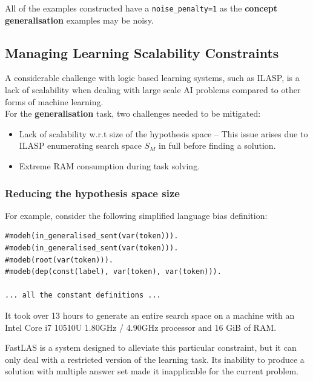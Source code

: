 All of the examples constructed have a \verb+noise_penalty=1+ as the \textbf{concept generalisation} examples may be noisy.


\subsection{Managing Learning Scalability Constraints}

A considerable challenge with logic based learning systems, such as ILASP, is a lack of scalability when dealing with large scale AI problems compared to other forms of machine learning. \\
For the \textbf{generalisation} task, two challenges needed to be mitigated: 
\begin{itemize}
    \item Lack of scalability w.r.t size of the hypothesis space -- This issue arises due to ILASP enumerating search space $S_M$ in full before finding a solution.
    \item Extreme RAM consumption during task solving.
\end{itemize}

\subsubsection{Reducing the hypothesis space size}
\label{reducing-the-hypothesis-space-size}

For example, consider the following simplified language bias definition:
\begin{verbatim}
#modeh(in_generalised_sent(var(token))).
#modeb(in_generalised_sent(var(token))).
#modeb(root(var(token))).
#modeb(dep(const(label), var(token), var(token))).

... all the constant definitions ...
\end{verbatim}


It took over 13 hours to generate an entire search space on a machine with an Intel Core i7 10510U 1.80GHz / 4.90GHz processor and 16 GiB of RAM.

FastLAS \cite{RefWorks:RefID:19-law2020fastlas:} is a system designed to alleviate this particular constraint, but it can only deal with a restricted version of the learning task.
Its inability to produce a solution with multiple answer set made it inapplicable for the current problem.

